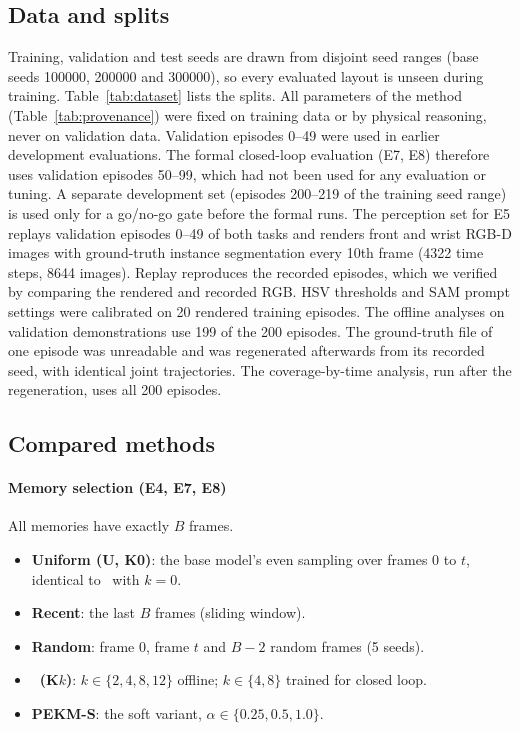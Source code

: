 \subsection{Data and splits}
\label{sec:splits}
Training, validation and test seeds are drawn from disjoint seed ranges (base seeds 100000, 200000 and 300000), so every evaluated layout is unseen during training. Table~\ref{tab:dataset} lists the splits. All parameters of the method (Table~\ref{tab:provenance}) were fixed on training data or by physical reasoning, never on validation data. Validation episodes 0--49 were used in earlier development evaluations. The formal closed-loop evaluation (E7, E8) therefore uses validation episodes 50--99, which had not been used for any evaluation or tuning. A separate development set (episodes 200--219 of the training seed range) is used only for a go/no-go gate before the formal runs. The perception set for E5 replays validation episodes 0--49 of both tasks and renders front and wrist RGB-D images with ground-truth instance segmentation every 10th frame (4322 time steps, 8644 images). Replay reproduces the recorded episodes, which we verified by comparing the rendered and recorded RGB. HSV thresholds and SAM prompt settings were calibrated on 20 rendered training episodes. The offline analyses on validation demonstrations use 199 of the 200 episodes. The ground-truth file of one episode was unreadable and was regenerated afterwards from its recorded seed, with identical joint trajectories. The coverage-by-time analysis, run after the regeneration, uses all 200 episodes.

\subsection{Compared methods}
\label{sec:baselines}
\paragraph{Memory selection (E4, E7, E8)} All memories have exactly $B$ frames.
\begin{itemize}
\item \textbf{Uniform (U, K0)}: the base model's even sampling over frames 0 to $t$, identical to \pekm\ with $k=0$.
\item \textbf{Recent}: the last $B$ frames (sliding window).
\item \textbf{Random}: frame 0, frame $t$ and $B-2$ random frames (5 seeds).
\item \textbf{\pekm\ (K$k$)}: $k \in \{2, 4, 8, 12\}$ offline; $k \in \{4, 8\}$ trained for closed loop.
\item \textbf{PEKM-S}: the soft variant, $\alpha \in \{0.25, 0.5, 1.0\}$.
\end{itemize}

